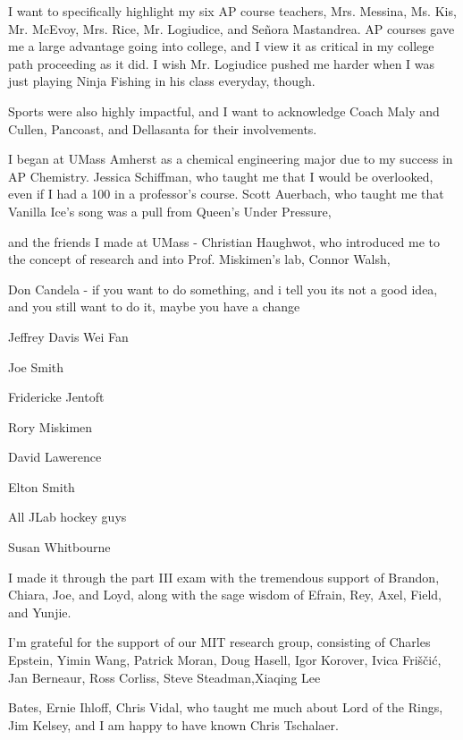 I want to specifically highlight my six AP course teachers, Mrs. Messina, Ms. Kis, Mr. McEvoy, Mrs. Rice, Mr. Logiudice, and Se\~nora Mastandrea. AP courses gave me a large advantage going into college, and I view it as critical in my college path proceeding as it did. I wish Mr. Logiudice pushed me harder when I was just playing Ninja Fishing in his class everyday, though. 

Sports were also highly impactful, and I want to acknowledge Coach Maly and Cullen, Pancoast, and Dellasanta for their involvements. 


I began at UMass Amherst as a chemical engineering major due to my success in AP Chemistry. Jessica Schiffman, who taught me that I would be overlooked, even if I had a 100 in a professor's course. Scott Auerbach, who taught me that Vanilla Ice's song was a pull from Queen's Under Pressure, 

and the friends I made at UMass - Christian Haughwot, who introduced me to the concept of research and into Prof. Miskimen's lab, Connor Walsh, 

Don Candela - if you want to do something, and i tell you its not a good idea, and you still want to do it, maybe you have a change

Jeffrey Davis
Wei Fan

Joe Smith

Fridericke Jentoft


Rory Miskimen

David Lawerence

Elton Smith

All JLab hockey guys

Susan Whitbourne


I made it through the part III exam with the tremendous support of Brandon, Chiara, Joe, and Loyd, along with the sage wisdom of Efrain, Rey, Axel, Field, and Yunjie. 

I'm grateful for the support of our MIT research group, consisting of Charles Epstein, Yimin Wang, Patrick Moran, Doug Hasell, Igor Korover, Ivica Friščić, Jan Berneaur, Ross Corliss, Steve Steadman,Xiaqing Lee

Bates, Ernie Ihloff, Chris Vidal, who taught me much about Lord of the Rings, Jim Kelsey, and I am happy to have known Chris Tschalaer.



